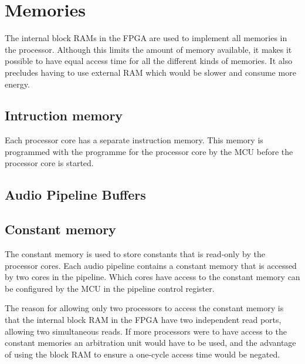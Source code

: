 \section{Memories}\label{sec:fpga-memories}

The internal block RAMs in the FPGA are used to implement all memories in the processor.
Although this limits the amount of memory available, it makes it possible to have
equal access time for all the different kinds of memories. It also precludes having
to use external RAM which would be slower and consume more energy.

\subsection{Intruction memory}

Each processor core has a separate instruction memory. This memory is programmed
with the programme for the processor core by the MCU before the processor core is
started.

\subsection{Audio Pipeline Buffers}

\subsection{Constant memory}

The constant memory is used to store constants that is read-only by the processor
cores. Each audio pipeline contains a constant memory that is accessed by two
cores in the pipeline. Which cores have access to the constant memory can be
configured by the MCU in the pipeline control register.

The reason for allowing only two processors to access the constant memory is
that the internal block RAM in the FPGA have two independent read ports, allowing
two simultaneous reads. If more processors were to have access to the constant
memories an arbitration unit would have to be used, and the advantage of using
the block RAM to ensure a one-cycle access time would be negated.

